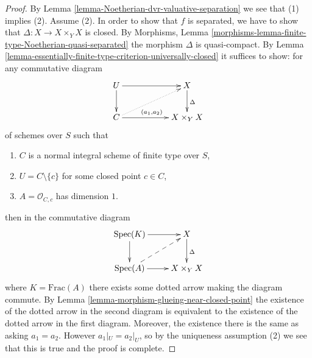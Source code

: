 \documentclass[10pt,a4paper]{amsart}
\theoremstyle{plain}
\theoremstyle{definition}
\theoremstyle{remark}
\numberwithin{equation}{subsection}
\def\Spec{\mathop{\mathrm{Spec}}}
\begin{document}
\begin{proof}
By Lemma \ref{lemma-Noetherian-dvr-valuative-separation} we see that
(1) implies (2). Assume (2). In order to show that $f$ is separated,
we have to show that $\Delta : X \to X \times_Y X$ is closed. By
Morphisms, Lemma \ref{morphisms-lemma-finite-type-Noetherian-quasi-separated}
the morphism $\Delta$ is quasi-compact.
By Lemma \ref{lemma-essentially-finite-type-criterion-universally-closed}
it suffices to show: for any commutative diagram
$$
\xymatrix{
U \ar[rr] \ar[d] & & X \ar[d]^\Delta \\
C \ar[rr]^{(a_1, a_2)} \ar@{..>}[rru] & & X \times_Y X
}
$$
of schemes over $S$ such that
\begin{enumerate}
\item $C$ is a normal integral scheme of finite type over $S$,
\item $U = C \setminus \{c\}$ for some closed point $c \in C$,
\item $A = \mathcal{O}_{C, c}$ has dimension $1$.
\end{enumerate}
then in the commutative diagram
$$
\xymatrix{
\Spec(K) \ar[r] \ar[d] & X \ar[d]^\Delta \\
\Spec(A) \ar[r] \ar@{-->}[ru] & X \times_Y X
}
$$
where $K = \text{Frac}(A)$ there exists some dotted arrow
making the diagram commute. By
Lemma \ref{lemma-morphism-glueing-near-closed-point}
the existence of the dotted arrow in the second diagram
is equivalent to the existence of the dotted arrow
in the first diagram. Moreover, the existence there
is the same as asking $a_1 = a_2$. However $a_1|_U = a_2|_U$, so
by the uniqueness assumption (2) we see that this is true
and the proof is complete.
\end{proof}
\end{document}
